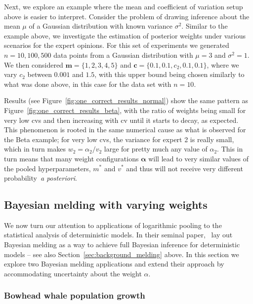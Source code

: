 \documentclass[a4paper, notitlepage, 11pt]{article}
\begin{document}
Next, we explore an example where the mean and coefficient of variation setup above is easier to interpret.
Consider the problem of drawing inference about the mean $\mu$ of a Gaussian distribution with known variance $\sigma^2$.
Similar to the example above, we investigate the estimation of posterior weights under various scenarios for the expert opinions.
For this set of experiments we generated $n=10, 100, 500$ data points from a Gaussian distribution with $\mu=3$ and  $\sigma^2 = 1$.
We then considered $\boldsymbol{m} = \{1, 2, 3, 4, 5\}$ and $\boldsymbol c = \{0.1, 0.1, c_2, 0.1, 0.1 \}$, where we vary $c_2$ between $0.001$ and $1.5$, with this upper bound being chosen similarly to what was done above, in this case for the data set with $n=10$.

Results (see Figure~\ref{fig:one_correct_results_normal}) show the same pattern as Figure~\ref{fig:one_correct_results_beta}, with the ratio of weights being small for very low cvs and then increasing with cv until it starts to decay, as expected.
This phenomenon is rooted in the same numerical cause as what is observed for the Beta example; for very low cvs, the variance for expert 2 is really small, which in turn makes $w_2 = \alpha_2/v_2$ large for pretty much any value of $\alpha_2$.
This in turn means that many weight configurations $\boldsymbol{\alpha}$ will lead to very similar values of the pooled hyperparameters, $m^\ast$ and $v^\ast$ and thus will not receive very different probability~\textit{a posteriori}.

\subsection{Bayesian melding with varying weights}
\label{sec:melding_apps}

We now turn our attention to applications of logarithmic pooling to the statistical analysis of deterministic models.
In their seminal paper,~\cite{Poole2000} lay out Bayesian melding as a way to achieve full Bayesian inference for deterministic models -- see also Section~\ref{sec:background_melding} above.
In this section we explore two Bayesian melding applications and extend their approach by accommodating uncertainty about the weight $\alpha$. 

\subsubsection{Bowhead whale population growth}
\label{sec:bowhead}
\end{document}
